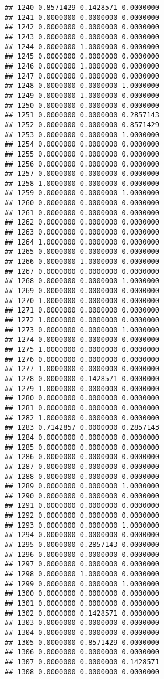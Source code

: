 \documentclass[
]{article}
\begin{document}
\begin{verbatim}
## 1240 0.8571429 0.1428571 0.0000000
## 1241 0.0000000 0.0000000 0.0000000
## 1242 0.0000000 0.0000000 0.0000000
## 1243 0.0000000 0.0000000 0.0000000
## 1244 0.0000000 1.0000000 0.0000000
## 1245 0.0000000 0.0000000 0.0000000
## 1246 0.0000000 1.0000000 0.0000000
## 1247 0.0000000 0.0000000 0.0000000
## 1248 0.0000000 0.0000000 1.0000000
## 1249 0.0000000 1.0000000 0.0000000
## 1250 0.0000000 0.0000000 0.0000000
## 1251 0.0000000 0.0000000 0.2857143
## 1252 0.0000000 0.0000000 0.8571429
## 1253 0.0000000 0.0000000 1.0000000
## 1254 0.0000000 0.0000000 0.0000000
## 1255 0.0000000 0.0000000 0.0000000
## 1256 0.0000000 0.0000000 0.0000000
## 1257 0.0000000 0.0000000 0.0000000
## 1258 1.0000000 0.0000000 0.0000000
## 1259 0.0000000 0.0000000 1.0000000
## 1260 0.0000000 0.0000000 0.0000000
## 1261 0.0000000 0.0000000 0.0000000
## 1262 0.0000000 0.0000000 0.0000000
## 1263 0.0000000 0.0000000 0.0000000
## 1264 1.0000000 0.0000000 0.0000000
## 1265 0.0000000 0.0000000 0.0000000
## 1266 0.0000000 1.0000000 0.0000000
## 1267 0.0000000 0.0000000 0.0000000
## 1268 0.0000000 0.0000000 1.0000000
## 1269 0.0000000 0.0000000 0.0000000
## 1270 1.0000000 0.0000000 0.0000000
## 1271 0.0000000 0.0000000 0.0000000
## 1272 1.0000000 0.0000000 0.0000000
## 1273 0.0000000 0.0000000 1.0000000
## 1274 0.0000000 0.0000000 0.0000000
## 1275 1.0000000 0.0000000 0.0000000
## 1276 0.0000000 0.0000000 0.0000000
## 1277 1.0000000 0.0000000 0.0000000
## 1278 0.0000000 0.1428571 0.0000000
## 1279 1.0000000 0.0000000 0.0000000
## 1280 0.0000000 0.0000000 0.0000000
## 1281 0.0000000 0.0000000 0.0000000
## 1282 1.0000000 0.0000000 0.0000000
## 1283 0.7142857 0.0000000 0.2857143
## 1284 0.0000000 0.0000000 0.0000000
## 1285 0.0000000 0.0000000 0.0000000
## 1286 0.0000000 0.0000000 0.0000000
## 1287 0.0000000 0.0000000 0.0000000
## 1288 0.0000000 0.0000000 0.0000000
## 1289 0.0000000 0.0000000 1.0000000
## 1290 0.0000000 0.0000000 0.0000000
## 1291 0.0000000 0.0000000 0.0000000
## 1292 0.0000000 0.0000000 0.0000000
## 1293 0.0000000 0.0000000 1.0000000
## 1294 0.0000000 0.0000000 0.0000000
## 1295 0.0000000 0.2857143 0.0000000
## 1296 0.0000000 0.0000000 0.0000000
## 1297 0.0000000 0.0000000 0.0000000
## 1298 0.0000000 1.0000000 0.0000000
## 1299 0.0000000 0.0000000 1.0000000
## 1300 0.0000000 0.0000000 0.0000000
## 1301 0.0000000 0.0000000 0.0000000
## 1302 0.0000000 0.1428571 0.0000000
## 1303 0.0000000 0.0000000 0.0000000
## 1304 0.0000000 0.0000000 0.0000000
## 1305 0.0000000 0.8571429 0.0000000
## 1306 0.0000000 0.0000000 0.0000000
## 1307 0.0000000 0.0000000 0.1428571
## 1308 0.0000000 0.0000000 0.0000000

\end{verbatim}
\end{document}
